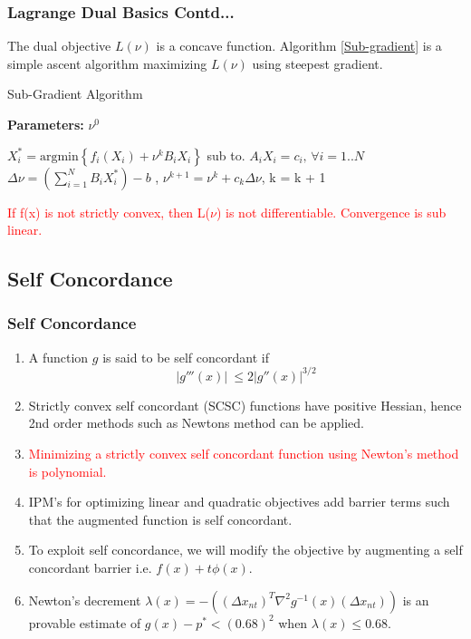 \documentclass{beamer}
\newcommand\FontviNine{\fontsize{9}{7.2}\selectfont}
\begin{document}
\begin{frame}
\frametitle{Lagrange Dual Basics Contd...}
\FontviNine
The dual objective $L(\nu)$ is a concave function. Algorithm \ref{Sub-gradient} is a simple ascent algorithm maximizing $L(\nu)$ using steepest gradient.
\begin{algorithm}[H]
\caption{Sub-Gradient Algorithm }
\label{Sub-gradient}
\textbf{Parameters:} $\nu^0$
\begin{algorithmic}[1]
\State $X_i^{*} = \mathrm{arg min} \left\lbrace f_i(X_i) + \nu^k B_i X_i\right\rbrace$ sub to. $A_i X_i = c_i , \,\forall i= 1 .. N$
\State $\Delta \nu = \left( \sum_{i = 1}^{N} B_i X_i^{*} \right) - b$ , 
\State $\nu^{k+1} = \nu^k + c_k \Delta \nu$,   
\State k = k + 1
\EndFor
\EndProcedure
\end{algorithmic}
\end{algorithm}
\textcolor{red}{If f(x) is not strictly convex, then L($\nu$) is not differentiable. Convergence is sub linear.}
\end{frame}

\subsection{Self Concordance}
\begin{frame}
\frametitle{Self Concordance}
\begin{enumerate}
\item A function $g$ is said to be self concordant if 
\begin{equation}
\lvert g'''(x)\rvert\ \leq 2 \lvert g''(x) \rvert ^{3/2} \nonumber
\end{equation}
\item Strictly convex self concordant (SCSC) functions have positive Hessian, hence 2nd order methods such as Newtons method can be applied.
\item \textcolor{red}{Minimizing a strictly convex self concordant function using Newton's method is polynomial.}
\item IPM's for optimizing linear and quadratic objectives add barrier terms such that the augmented function is self concordant.
\item To exploit self concordance, we will modify the objective by augmenting a self concordant barrier i.e. $f(x) + t \phi(x)$.
\item Newton's decrement $\lambda(x) = -((\Delta x_{nt})^T \nabla^2 g^{-1}(x) (\Delta x_{nt}) )$ is an provable estimate of $g(x) - p^{*} < (0.68)^2$ when $\lambda(x) \leq 0.68 $.
\end{enumerate}
\end{frame}
\end{document}
